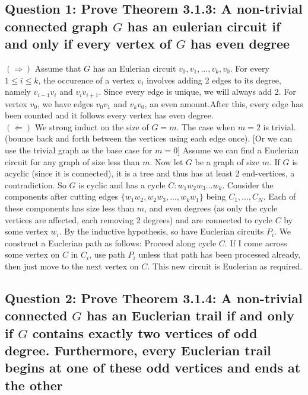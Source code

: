 \documentclass[letterpaper, 11pt]{article}
\newcommand{\1}{\mathds{1}}	%
\theoremstyle{definition}
\begin{document}
\subsection*{Question 1: Prove Theorem 3.1.3: A non-trivial connected graph $G$ has an eulerian circuit if and only if every vertex of $G$ has even degree}
$(\Longrightarrow)$ Assume that $G$ has an Eulerian circuit $v_0,v_1,...,v_k,v_0$. For every $1 \le i \le k$, the occurence of a vertex $v_i$ involves adding 2 edges to its degree, namely $v_{i-1}v_i$ and $v_iv_{i+1}$. Since every edge is unique, we will always add 2. For vertex $v_0$, we have edges $v_0v_1$ and $v_{k}v_0$, an even amount.After this, every edge has been counted and it follows every vertex has even degree. \\
$(\Longleftarrow)$ We strong induct on the size of $G = m$. The case when $m = 2$ is trivial. (bounce back and forth between the vertices using each edge once). [Or we can use the trivial graph as the base case for $m=0$] Assume we can find a Euclerian circuit for any graph of size less than $m$. Now let $G$ be a graph of size $m$. If $G$ is acyclic (since it is connected), it is a tree and thus has at least 2 end-vertices, a contradiction. So $G$ is cyclic and has a cycle $C: w_1w_2w_3...w_k$. Consider the components after cutting edges $\{w_1w_2, w_2w_3, ..., w_kw_1\}$ being $C_1, ..., C_N$. Each of these components has size less than $m$, and even degrees (as only the cycle vertices are affected, each removing 2 degrees) and are connected to cycle $C$ by some vertex $w_i$. By the inductive hypothesis, so have Euclerian circuits $P_i$. We construct a Euclerian path as follows: Proceed along cycle $C$. If I come across some vertex on $C$ in $C_i$, use path $P_i$ unless that path has been processed already, then just move to the next vertex on $C$. This new circuit is Euclerian as required.

\subsection*{Question 2: Prove Theorem 3.1.4: A non-trivial connected $G$ has an Euclerian trail if and only if $G$ contains exactly two vertices of odd degree. Furthermore, every Euclerian trail begins at one of these odd vertices and ends at the other}
\end{document}
